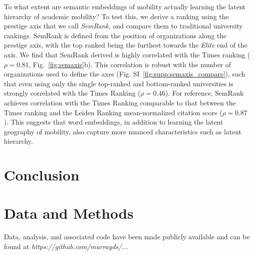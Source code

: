 \documentclass[12pt]{article} %
\begin{document}
To what extent are semantic embeddings of mobility actually learning the latent hierarchy of academic mobility?
To test this, we derive a ranking using the prestige axis that we call \textit{SemRank}, and compare them to traditional university rankings. 
SemRank is defined from the position of organizations along the prestige axis, with the top ranked being the furthest towards the \textit{Elite} end of the axis.
We find that SemRank derived is highly correlated with the Times ranking ($\rho = 0.81$, Fig.~\ref{fig:semaxis}b). 
This correlation is robust with the number of organizations used to define the axes (Fig. SI~\ref{fig:supp:semaxis_compare}), such that even using only the single top-ranked and bottom-ranked universities is strongly correlated with the Times Ranking ($\rho = 0.46$). 
For reference, SemRank achieves correlation with the Times Ranking comparable to that between the Times ranking and the Leiden Ranking mean-normalized citation score ($\rho = 0.87$). 
This suggests that word embeddings, in addition to learning the latent geography of mobility, also capture more nuanced characteristics such as latent hierarchy. 




%
% 
\section*{Conclusion}




%
%
\section*{Data and Methods}
\label{sec:datamethods} %

Data, analysis, and associated code have been made publicly available and can be found at \textit{https://github.com/murrayds/...}
\end{document}
